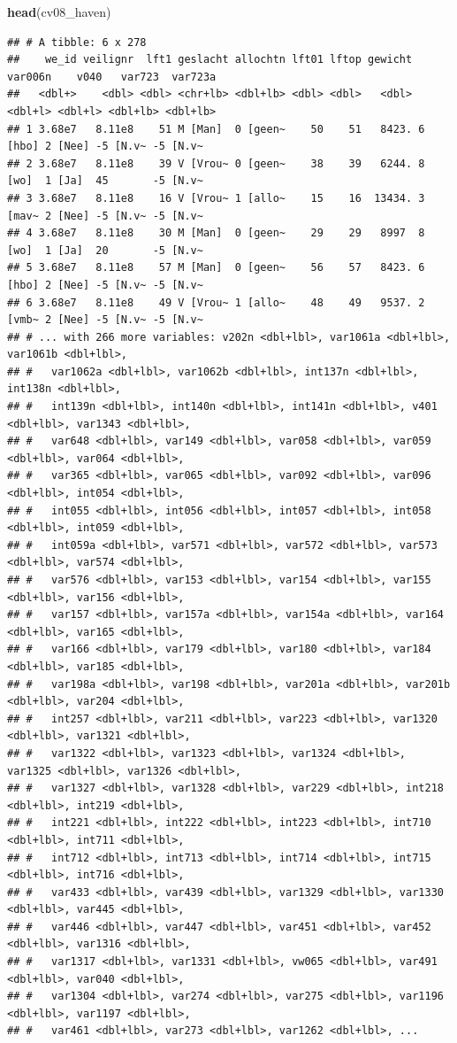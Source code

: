\documentclass[
]{book}
\newenvironment{Shaded}{\begin{snugshade}}{\end{snugshade}}
\newcommand{\KeywordTok}[1]{\textcolor[rgb]{0.13,0.29,0.53}{\textbf{#1}}}
\newcommand{\NormalTok}[1]{#1}
\begin{document}
\begin{Shaded}
\begin{Highlighting}[numbers=left,,]
\KeywordTok{head}\NormalTok{(cv08_haven)}
\end{Highlighting}
\end{Shaded}

\begin{verbatim}
## # A tibble: 6 x 278
##    we_id veilignr  lft1 geslacht allochtn lft01 lftop gewicht var006n    v040   var723  var723a
##   <dbl+>    <dbl> <dbl> <chr+lb> <dbl+lb> <dbl> <dbl>   <dbl> <dbl+l> <dbl+l> <dbl+lb> <dbl+lb>
## 1 3.68e7   8.11e8    51 M [Man]  0 [geen~    50    51   8423. 6 [hbo] 2 [Nee] -5 [N.v~ -5 [N.v~
## 2 3.68e7   8.11e8    39 V [Vrou~ 0 [geen~    38    39   6244. 8 [wo]  1 [Ja]  45       -5 [N.v~
## 3 3.68e7   8.11e8    16 V [Vrou~ 1 [allo~    15    16  13434. 3 [mav~ 2 [Nee] -5 [N.v~ -5 [N.v~
## 4 3.68e7   8.11e8    30 M [Man]  0 [geen~    29    29   8997  8 [wo]  1 [Ja]  20       -5 [N.v~
## 5 3.68e7   8.11e8    57 M [Man]  0 [geen~    56    57   8423. 6 [hbo] 2 [Nee] -5 [N.v~ -5 [N.v~
## 6 3.68e7   8.11e8    49 V [Vrou~ 1 [allo~    48    49   9537. 2 [vmb~ 2 [Nee] -5 [N.v~ -5 [N.v~
## # ... with 266 more variables: v202n <dbl+lbl>, var1061a <dbl+lbl>, var1061b <dbl+lbl>,
## #   var1062a <dbl+lbl>, var1062b <dbl+lbl>, int137n <dbl+lbl>, int138n <dbl+lbl>,
## #   int139n <dbl+lbl>, int140n <dbl+lbl>, int141n <dbl+lbl>, v401 <dbl+lbl>, var1343 <dbl+lbl>,
## #   var648 <dbl+lbl>, var149 <dbl+lbl>, var058 <dbl+lbl>, var059 <dbl+lbl>, var064 <dbl+lbl>,
## #   var365 <dbl+lbl>, var065 <dbl+lbl>, var092 <dbl+lbl>, var096 <dbl+lbl>, int054 <dbl+lbl>,
## #   int055 <dbl+lbl>, int056 <dbl+lbl>, int057 <dbl+lbl>, int058 <dbl+lbl>, int059 <dbl+lbl>,
## #   int059a <dbl+lbl>, var571 <dbl+lbl>, var572 <dbl+lbl>, var573 <dbl+lbl>, var574 <dbl+lbl>,
## #   var576 <dbl+lbl>, var153 <dbl+lbl>, var154 <dbl+lbl>, var155 <dbl+lbl>, var156 <dbl+lbl>,
## #   var157 <dbl+lbl>, var157a <dbl+lbl>, var154a <dbl+lbl>, var164 <dbl+lbl>, var165 <dbl+lbl>,
## #   var166 <dbl+lbl>, var179 <dbl+lbl>, var180 <dbl+lbl>, var184 <dbl+lbl>, var185 <dbl+lbl>,
## #   var198a <dbl+lbl>, var198 <dbl+lbl>, var201a <dbl+lbl>, var201b <dbl+lbl>, var204 <dbl+lbl>,
## #   int257 <dbl+lbl>, var211 <dbl+lbl>, var223 <dbl+lbl>, var1320 <dbl+lbl>, var1321 <dbl+lbl>,
## #   var1322 <dbl+lbl>, var1323 <dbl+lbl>, var1324 <dbl+lbl>, var1325 <dbl+lbl>, var1326 <dbl+lbl>,
## #   var1327 <dbl+lbl>, var1328 <dbl+lbl>, var229 <dbl+lbl>, int218 <dbl+lbl>, int219 <dbl+lbl>,
## #   int221 <dbl+lbl>, int222 <dbl+lbl>, int223 <dbl+lbl>, int710 <dbl+lbl>, int711 <dbl+lbl>,
## #   int712 <dbl+lbl>, int713 <dbl+lbl>, int714 <dbl+lbl>, int715 <dbl+lbl>, int716 <dbl+lbl>,
## #   var433 <dbl+lbl>, var439 <dbl+lbl>, var1329 <dbl+lbl>, var1330 <dbl+lbl>, var445 <dbl+lbl>,
## #   var446 <dbl+lbl>, var447 <dbl+lbl>, var451 <dbl+lbl>, var452 <dbl+lbl>, var1316 <dbl+lbl>,
## #   var1317 <dbl+lbl>, var1331 <dbl+lbl>, vw065 <dbl+lbl>, var491 <dbl+lbl>, var040 <dbl+lbl>,
## #   var1304 <dbl+lbl>, var274 <dbl+lbl>, var275 <dbl+lbl>, var1196 <dbl+lbl>, var1197 <dbl+lbl>,
## #   var461 <dbl+lbl>, var273 <dbl+lbl>, var1262 <dbl+lbl>, ...
\end{verbatim}
\end{document}
